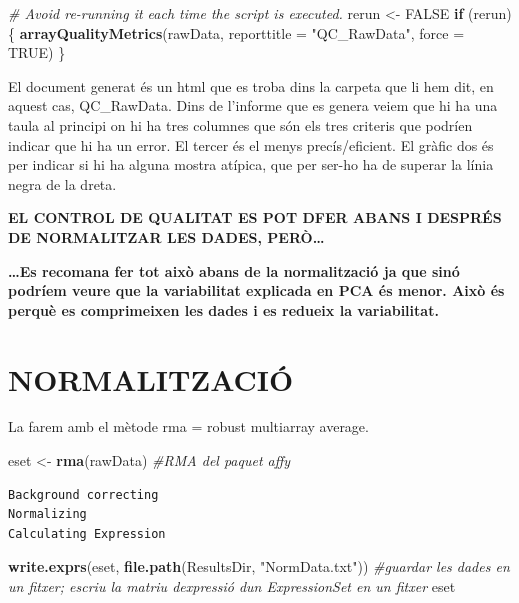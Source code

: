 \documentclass[
]{article}
\newenvironment{Shaded}{\begin{snugshade}}{\end{snugshade}}
\newcommand{\AttributeTok}[1]{\textcolor[rgb]{0.13,0.29,0.53}{#1}}
\newcommand{\CommentTok}[1]{\textcolor[rgb]{0.56,0.35,0.01}{\textit{#1}}}
\newcommand{\ConstantTok}[1]{\textcolor[rgb]{0.56,0.35,0.01}{#1}}
\newcommand{\ControlFlowTok}[1]{\textcolor[rgb]{0.13,0.29,0.53}{\textbf{#1}}}
\newcommand{\FunctionTok}[1]{\textcolor[rgb]{0.13,0.29,0.53}{\textbf{#1}}}
\newcommand{\NormalTok}[1]{#1}
\newcommand{\OtherTok}[1]{\textcolor[rgb]{0.56,0.35,0.01}{#1}}
\newcommand{\StringTok}[1]{\textcolor[rgb]{0.31,0.60,0.02}{#1}}
\begin{document}
\begin{Shaded}
\begin{Highlighting}[]
\CommentTok{\# Avoid re{-}running it each time the script is executed.}
\NormalTok{rerun }\OtherTok{\textless{}{-}} \ConstantTok{FALSE}
\ControlFlowTok{if}\NormalTok{ (rerun) \{}
    \FunctionTok{arrayQualityMetrics}\NormalTok{(rawData, }\AttributeTok{reporttitle =} \StringTok{"QC\_RawData"}\NormalTok{, }\AttributeTok{force =} \ConstantTok{TRUE}\NormalTok{)}
\NormalTok{\}}
\end{Highlighting}
\end{Shaded}

El document generat és un html que es troba dins la carpeta que li hem
dit, en aquest cas, QC\_RawData. Dins de l'informe que es genera veiem
que hi ha una taula al principi on hi ha tres columnes que són els tres
criteris que podríen indicar que hi ha un error. El tercer és el menys
precís/eficient. El gràfic dos és per indicar si hi ha alguna mostra
atípica, que per ser-ho ha de superar la línia negra de la dreta.

\textbf{EL CONTROL DE QUALITAT ES POT DFER ABANS I DESPRÉS DE
NORMALITZAR LES DADES, PERÒ\ldots{}}

\textbf{\ldots Es recomana fer tot això abans de la normalització ja que
sinó podríem veure que la variabilitat explicada en PCA és menor. Això
és perquè es comprimeixen les dades i es redueix la variabilitat.}

\section{NORMALITZACIÓ}\label{normalitzaciuxf3}

La farem amb el mètode rma = robust multiarray average.

\begin{Shaded}
\begin{Highlighting}[]
\NormalTok{eset }\OtherTok{\textless{}{-}} \FunctionTok{rma}\NormalTok{(rawData)  }\CommentTok{\#RMA del paquet affy}
\end{Highlighting}
\end{Shaded}

\begin{verbatim}
Background correcting
Normalizing
Calculating Expression
\end{verbatim}

\begin{Shaded}
\begin{Highlighting}[]
\FunctionTok{write.exprs}\NormalTok{(eset, }\FunctionTok{file.path}\NormalTok{(ResultsDir, }\StringTok{"NormData.txt"}\NormalTok{))  }\CommentTok{\#guardar les dades en un fitxer; escriu la matriu d\textquotesingle{}expressió d\textquotesingle{}un ExpressionSet en un fitxer}
\NormalTok{eset}
\end{Highlighting}
\end{Shaded}
\end{document}
